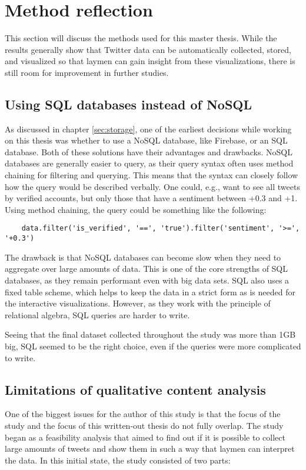 \section{Method reflection}
This section will discuss the methods used for this master thesis. While the results generally show that Twitter data can be automatically collected, stored, and visualized so that laymen can gain insight from these visualizations, there is still room for improvement in further studies.

\subsection*{Using SQL databases instead of NoSQL}
As discussed in chapter \ref{sec:storage}, one of the earliest decisions while working on this thesis was whether to use a NoSQL database, like Firebase, or an SQL database. Both of these solutions have their advantages and drawbacks. NoSQL databases are generally easier to query, as their query syntax often uses method chaining for filtering and querying. This means that the syntax can closely follow how the query would be described verbally. One could, e.g., want to see all tweets by verified accounts, but only those that have a sentiment between +0.3 and +1. Using method chaining, the query could be something like the following:

\begin{verbatim}
    data.filter('is_verified', '==', 'true').filter('sentiment', '>=', '+0.3')
\end{verbatim}

The drawback is that NoSQL databases can become slow when they need to aggregate over large amounts of data. This is one of the core strengths of SQL databases, as they remain performant even with big data sets. SQL also uses a fixed table scheme, which helps to keep the data in a strict form as is needed for the interactive visualizations. However, as they work with the principle of relational algebra, SQL queries are harder to write.

Seeing that the final dataset collected throughout the study was more than 1GB big, SQL seemed to be the right choice, even if the queries were more complicated to write.

\subsection*{Limitations of qualitative content analysis}
One of the biggest issues for the author of this study is that the focus of the study and the focus of this written-out thesis do not fully overlap. The study began as a feasibility analysis that aimed to find out if it is possible to collect large amounts of tweets and show them in such a way that laymen can interpret the data. In this initial state, the study consisted of two parts:

